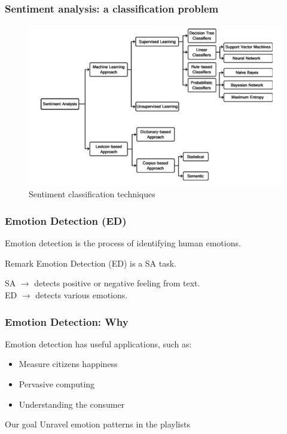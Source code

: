 \documentclass[xcolor=dvipsnames]{beamer}
\begin{document}
\begin{frame}
\frametitle{Sentiment analysis: a classification problem}
\begin{figure}
	\centering
	\includegraphics[scale=0.4]{./images/sentiment_classification}
	\caption{Sentiment classification techniques}
\end{figure}
\end{frame}

\begin{frame}
\frametitle{Emotion Detection (ED)}
\begin{definition}
Emotion detection is the process of identifying human emotions.
\end{definition}
\begin{block}{Remark}
Emotion Detection (ED) is a SA task.
\end{block}
SA  $\rightarrow$ detects positive or negative feeling from text.\\
ED  $\rightarrow$ detects various emotions.\\
\end{frame}

\begin{frame}
\frametitle{Emotion Detection: Why}
Emotion detection has useful applications, such as: 
\begin{itemize}
\item Measure citizens happiness
\item Pervasive computing
\item Understanding the consumer
\end{itemize}
\begin{block}{Our goal}
Unravel emotion patterns in the playlists
\end{block}
\end{frame}
\end{document}
